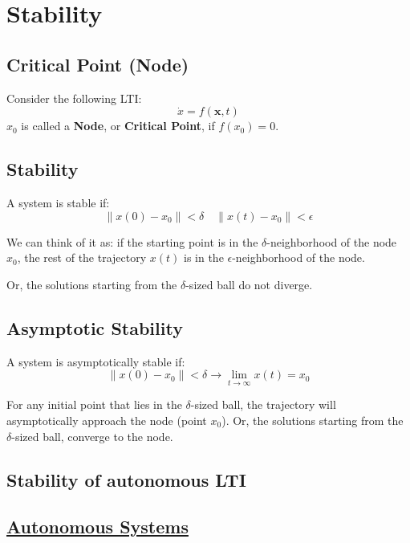 
\section{Stability}


\subsection{Critical Point (Node)}

\begin{tcolorbox}[colback=green!10,colframe=green!50!black,title=\textbf{Critical Point (Node)}]
Consider the following LTI:
\[
\dot{x} = f(\mathbf{x}, t)
\]
\(x_0\) is called a \textbf{Node}, or \textbf{Critical Point}, if \(f(x_0) = 0\).
\end{tcolorbox}

\subsection{Stability}
\begin{tcolorbox}
A system is stable if:
\[
\|x(0) - x_0 \| < \delta \quad \| x(t) -x_0\| < \epsilon
\]
\end{tcolorbox}

We can think of it as: if the starting point is in the $\delta$-neighborhood of the node $x_0$, 
the rest of the trajectory $x(t)$ is in the $\epsilon$-neighborhood of the node.

Or, the solutions starting from the $\delta$-sized ball do not diverge. 

\subsection*{Asymptotic Stability}

\begin{tcolorbox}
A system is asymptotically stable if:
\[
\|x(0) - x_0 \| < \delta \to \lim_{t \to \infty} x(t) = x_0 
\]
\end{tcolorbox}

For any initial point that lies in the \(\delta\)-sized ball, the trajectory will asymptotically approach the node (point $x_0$).
Or, the solutions starting from the \(\delta\)-sized ball, converge to the node. 


\subsection{Stability of autonomous LTI}

\subsection*{\underline{Autonomous Systems}}


